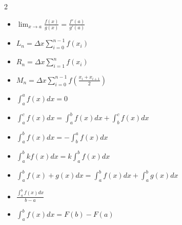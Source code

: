 \begin{itemize}
\begin{multicols}{2}
\begin{itemize}[itemsep=1em]
            \item $\displaystyle \lim_{x\to a} \frac {f(x)} {g(x)} = \frac {f'(a)} {g'(a)}$
            
            \item $\displaystyle L_n = \Delta x \sum _{i=0}^{n-1} f \left( x_i \right)$
            
            \item $\displaystyle R_n = \Delta x \sum _{i=1}^{n} f \left( x_i \right)$
            
            \item $\displaystyle M_n = \Delta x \sum _{i=0}^{n-1} f \left( \frac {x_i+x_{i+1}} {2} \right)$
            
            \item $\displaystyle \int _a^a f(x) dx = 0$
            
            \item $\displaystyle \int _a^c f(x) dx = \int _a^b f(x) dx + \int _b^c f(x) dx$
            
            \item $\displaystyle \int _a^b f(x) dx = - \int _b^a f(x) dx$
            
            \item $\displaystyle \int _a^b k f(x) dx = k \int _a^b f(x) dx$
            
            \item $\displaystyle \int _a^b f(x) + g(x) dx = \int _a^b f(x) dx + \int _a^b g(x) dx$
            
            \item $\displaystyle \frac {\int _a^b f(x) dx} {b-a}$
            
            \item $\displaystyle \int _a^b f(x) dx = F(b) - F(a)$
        
        \end{itemize}

    \end{multicols}
        
\end{itemize}

\pagebreak


